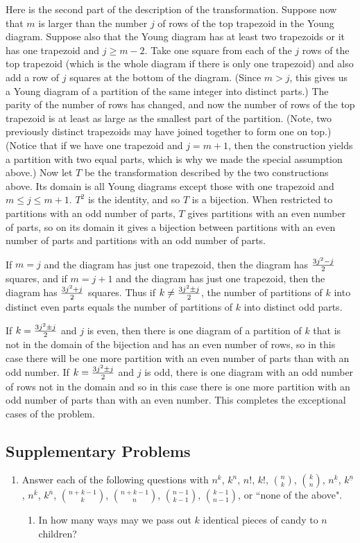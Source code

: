 {{Here is the second part of the description of the
transformation.  Suppose now that
$m$ is larger than the number $j$ of rows of the top trapezoid in
the Young diagram.   Suppose also that
the Young diagram has at least two trapezoids or  it
has one trapezoid and $j\ge m-2$. Take one square from each of the
$j$ rows  of the top trapezoid (which is the whole diagram if there
is only one trapezoid) and also add a row of
$j$ squares at the bottom of the diagram.  (Since $m>j$, this gives us
a Young diagram of a partition of the same integer into distinct
parts.)  The parity of the number of rows has changed, and now the
number of rows of the top trapezoid is at least as large as the
smallest part of the partition.  (Note, two previously distinct
trapezoids may have joined together to form one on top.) 
(Notice that if we have one trapezoid and $j= m+1$, then the
construction yields a partition with two equal parts, which is why
we made the special assumption above.)  Now let $T$ be the
transformation  described by the two constructions above.  Its
domain is all Young diagrams except those with one trapezoid and
$m\le j\le m+1$.  $T^2$ is the identity, and so $T$ is a bijection. 
When restricted to partitions with an odd number of parts, $T$
gives partitions with an even number of parts, so on its domain it
gives a bijection between partitions with an even number of parts
and partitions with an odd number of parts.

If $m=j$ and the diagram has just one trapezoid, then the diagram has
$3j^2-j\over 2$ squares, and if
$m=j+1$ and the diagram has just one trapezoid, then the diagram has
$3j^2+j\over 2$ squares.   Thus if
$k\ne {3j^2\pm j\over 2}$, the number of partitions of $k$ into distinct
even parts equals the number of partitions of $k$ into distinct odd
parts.  

If
$k= {3j^2\pm j\over 2}$ and $j$ is even, then there is one diagram of
a partition of $k$ that is not in the domain of the bijection and has
an even number of rows, so in this case there will be one more
partition with an even number of parts than with an odd number.  If
 $k=
{3j^2\pm j\over 2}$ and $j$ is odd, there is one diagram with an
odd number of rows not in the domain and so in this case there is
one more partition with an odd number of parts than with an even
number.  This completes the exceptional cases of the problem.}
\ep



\subsection{Supplementary Problems}  
\begin{enumerate}
\item Answer each of the following questions with $n^k$,
$k^n$, $n!$,
$k!$,
$n \choose k$, $k \choose n$, $n^{\underline{k}}$, $k^{\underline{n}}$,
$n^{\overline{k}}$, $k^{\overline{n}}$, $n+k-1\choose k$, 
$n+k-1\choose n$, $n-1\choose k-1$, $k-1\choose n-1$, or ``none of the
above".
\begin{enumerate} 
\item In how many ways may we pass out $k$ identical pieces of candy to
$n$ children?


\end{enumerate}
\end{enumerate}}
